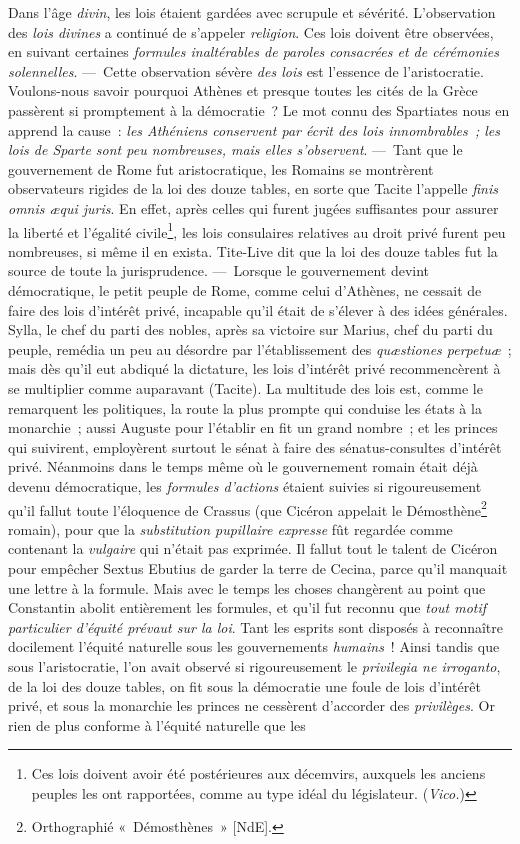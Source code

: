 \documentclass[french,twoside]{book} %
\begin{document}
Dans l’âge {\itshape divin}, les lois étaient gardées avec scrupule et sévérité. L’observation des {\itshape lois divines} a continué de s’appeler {\itshape religion}. Ces lois doivent être observées, en suivant certaines {\itshape formules inaltérables de paroles consacrées et de cérémonies solennelles}. — Cette observation sévère {\itshape des lois} est l’essence de l’aristocratie. Voulons-nous savoir pourquoi Athènes et presque toutes les cités de la Grèce passèrent si promptement à la démocratie ? Le mot connu des Spartiates nous en apprend la cause : {\itshape les Athéniens conservent par écrit des lois innombrables ; les lois de Sparte sont peu nombreuses, mais elles s’observent}. — Tant que le gouvernement de Rome fut aristocratique, les Romains se montrèrent observateurs rigides de la loi des douze tables, en sorte que Tacite l’appelle \emph{{\itshape finis omnis æqui juris}}. En effet, après celles qui furent jugées suffisantes  pour assurer la liberté et l’égalité civile\footnote{Ces lois doivent avoir été postérieures aux décemvirs, auxquels les anciens peuples les ont rapportées, comme au type idéal du législateur. ({\itshape Vico.})}, les lois consulaires relatives au droit privé furent peu nombreuses, si même il en exista. Tite-Live dit que la loi des douze tables fut la source de toute la jurisprudence. — Lorsque le gouvernement devint démocratique, le petit peuple de Rome, comme celui d’Athènes, ne cessait de faire des lois d’intérêt privé, incapable qu’il était de s’élever à des idées générales. Sylla, le chef du parti des nobles, après sa victoire sur Marius, chef du parti du peuple, remédia un peu au désordre par l’établissement des {\itshape quæstiones perpetuæ} ; mais dès qu’il eut abdiqué la dictature, les lois d’intérêt privé recommencèrent à se multiplier comme auparavant (Tacite). La multitude des lois est, comme le remarquent les politiques, la route la plus prompte qui conduise les états à la monarchie ; aussi Auguste pour l’établir en fit un grand nombre ; et les princes qui suivirent, employèrent surtout le sénat à faire des sénatus-consultes d’intérêt privé. Néanmoins dans le temps même où le gouvernement romain était déjà devenu démocratique, les {\itshape formules d’actions} étaient suivies si rigoureusement qu’il fallut toute l’éloquence de Crassus (que Cicéron appelait le Démosthène\footnote{Orthographié « Démosthènes » [NdE].} romain), pour que la {\itshape substitution pupillaire expresse} fût regardée comme contenant la {\itshape vulgaire} qui n’était pas exprimée. Il fallut tout le talent de  Cicéron pour empêcher Sextus Ebutius de garder la terre de Cecina, parce qu’il manquait une lettre à la formule. Mais avec le temps les choses changèrent au point que Constantin abolit entièrement les formules, et qu’il fut reconnu que {\itshape tout motif particulier d’équité prévaut sur la loi}. Tant les esprits sont disposés à reconnaître docilement l’équité naturelle sous les gouvernements {\itshape humains} ! Ainsi tandis que sous l’aristocratie, l’on avait observé si rigoureusement le {\itshape privilegia ne irroganto}, de la loi des douze tables, on fit sous la démocratie une foule de lois d’intérêt privé, et sous la monarchie les princes ne cessèrent d’accorder des {\itshape privilèges}. Or rien de plus conforme à l’équité naturelle que les 
\end{document}

